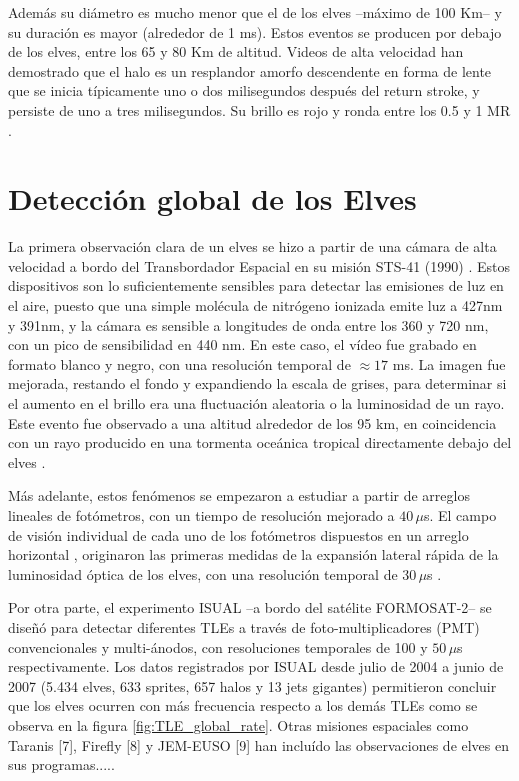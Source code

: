 \documentclass[12pt,oneside,openany,letter]{book}
\begin{document}
Además su diámetro es mucho menor que el de los elves --máximo de 100 Km-- y su duración es mayor (alrededor de 1 ms). Estos eventos se producen por debajo de los elves, entre los 65 y 80 Km de altitud. Videos de alta velocidad \cite{ArmstrongLyons2000, StanleyEtal1999, StenbaekEtal2000} han demostrado que el halo es un resplandor amorfo descendente en forma de lente que se inicia típicamente uno o dos milisegundos después del return stroke, y persiste de uno a tres milisegundos. Su brillo es rojo y ronda entre los 0.5 y 1 MR \cite{FullekrugEtal2006}.


\chapter{Detección global de los Elves}\label{deteccion}
La primera observación clara de un elves se hizo a partir de una cámara de alta velocidad a bordo del Transbordador Espacial en su misión STS-41 (1990) \cite{BoeckEtal1992}. Estos dispositivos son lo suficientemente sensibles para detectar las emisiones de luz en el aire, puesto que una simple molécula de nitrógeno ionizada emite luz a 427nm y 391nm, y la cámara es sensible a longitudes de onda entre los 360 y 720 nm, con un pico de sensibilidad en 440 nm. En este caso, el vídeo fue grabado en formato blanco y negro, con una resolución temporal de $\approx 17$ ms. La imagen fue mejorada, restando el fondo y expandiendo la escala de grises, para determinar si el aumento en el brillo era una fluctuación aleatoria o la luminosidad de un rayo. Este evento fue observado a una altitud alrededor de los 95 km, en coincidencia con un rayo producido en una tormenta oceánica tropical directamente debajo del elves \cite{BoeckEtal1992}.  

Más adelante, estos fenómenos se empezaron a estudiar a partir de arreglos lineales de fot\'ometros, con un tiempo de resolución mejorado a $40\,\mu$s. El campo de visión individual de cada uno de los fotómetros dispuestos en un arreglo horizontal \cite{InanEtal1997}, originaron las primeras medidas de la expansión lateral rápida de la luminosidad óptica de los elves, con una resolución temporal de $30\,\mu$s . 

Por otra parte, el experimento ISUAL \cite{chen2008} --a bordo del sat\'elite FORMOSAT-2-- se diseñó para detectar diferentes TLEs a través de foto-multiplicadores (PMT) convencionales y multi-ánodos, con resoluciones temporales de 100 y $50\,\mu$s respectivamente. Los datos registrados por ISUAL desde julio de 2004 a junio de 2007 (5.434 elves, 633 sprites, 657 halos y 13 jets gigantes) permitieron concluir que los elves ocurren con m\'as frecuencia respecto a los demás TLEs como se observa en la figura \ref{fig:TLE_global_rate}. Otras misiones espaciales como Taranis [7], Firefly [8] y JEM-EUSO [9] han incluído las observaciones de elves en sus programas.....
\end{document}
